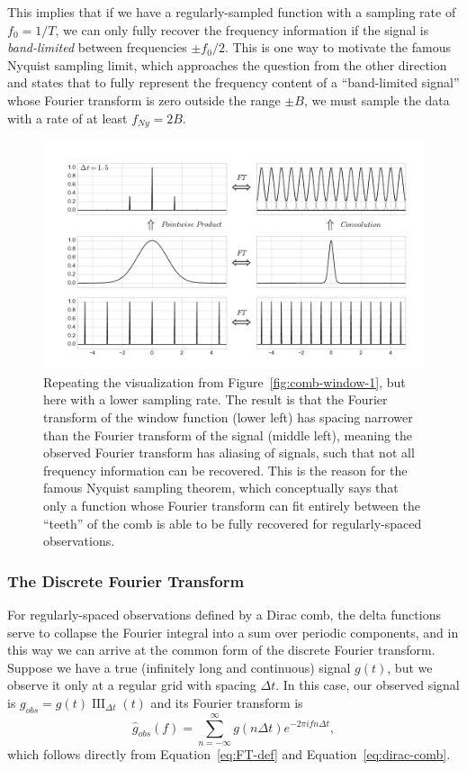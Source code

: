\documentclass[preprint]{aastex}
\DeclareMathOperator{\III}{III}
\newcommand{\fig}[1]{Figure~\ref{fig:#1}}
\newcommand{\figlabel}[1]{\label{fig:#1}}
\newcommand{\Eq}[1]{Equation~\ref{eq:#1}}
\newcommand{\eq}[1]{\Eq{#1}}
\newcommand{\eqlabel}[1]{\label{eq:#1}}
\begin{document}
This implies that if we have a regularly-sampled function with a sampling
rate of $f_0 = 1/T$, we can only fully recover the frequency information
if the signal is {\it band-limited} between frequencies $\pm f_0/2$.
This is one way to motivate the famous Nyquist sampling limit, which
approaches the question from the other direction and states
that to fully represent the frequency content of a ``band-limited signal''
whose Fourier transform is zero outside the range $\pm B$,
we must sample the data with a rate of at least $f_{Ny} = 2B$.

\begin{figure}[ht]
  \centering
  \includegraphics[width=\textwidth]{fig08_comb_window_2}
  \caption{Repeating the visualization from \fig{comb-window-1}, but here with
    a lower sampling rate. The result is that the Fourier transform of the
    window function (lower left) has spacing narrower than the Fourier transform
    of the signal (middle left), meaning the observed Fourier transform has
    aliasing of signals, such that not all frequency information can be
    recovered. This is the reason for the famous Nyquist sampling theorem,
    which conceptually says that only a function whose Fourier transform can
    fit entirely between the ``teeth'' of the comb is able to be fully
    recovered for regularly-spaced observations.
    \figlabel{comb-window-2}}
\end{figure}

\subsubsection{The Discrete Fourier Transform}
For regularly-spaced observations defined by a Dirac comb, the delta functions
serve to collapse the Fourier integral into a sum over periodic components,
and in this way we can arrive at the common form of the discrete Fourier
transform.
Suppose we have a true (infinitely long and continuous) signal $g(t)$, but
we observe it only at a regular grid with spacing $\Delta t$. In this case, our
observed signal is $g_{obs} = g(t) \III_{\Delta t}(t)$ and its Fourier transform is
\begin{equation}
  \hat{g}_{obs}(f) = \sum_{n=-\infty}^\infty g(n\Delta t) e^{-2\pi i f n \Delta t},
  \eqlabel{DFT-f-inf}
\end{equation}
which follows directly from \eq{FT-def} and \eq{dirac-comb}.
\end{document}
